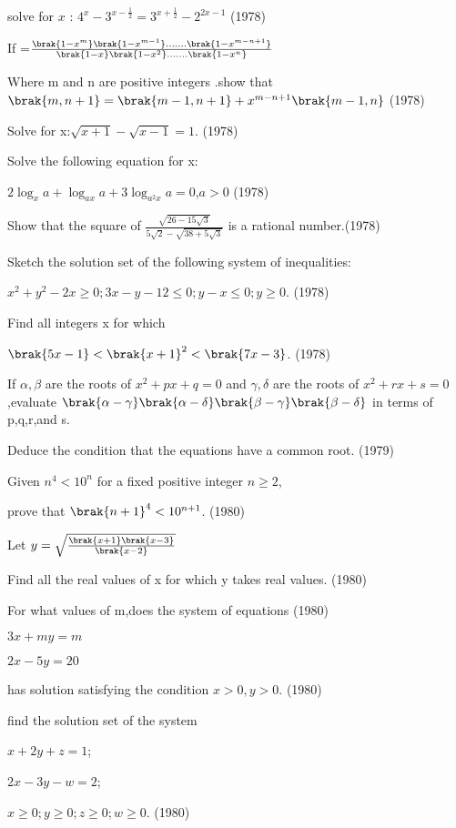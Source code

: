  \iffalse
    \title{Assignment}
    \author{Pappuri Prahladha}
    \section{subjective}
  \fi

     \item solve for $x$ : $4^x-3^{x-\frac{1}{2}}=3^{x+\frac{1}{2}}-2^{2x-1}$                       \hfill  (1978)

 

\item If =$\frac{\brak{1-x^m}\brak{1-x^{m-1}}.......\brak{1-x^{m-n+1}}}{\brak{1-x}\brak{1-x^2}.......\brak{1-x^n}}$

Where m and n are positive integers .show that 
$\brak{m,n+1}=\brak{m-1,n+1}+x^{m-n+1}\brak{m-1,n}$ \hfill (1978)
 \item Solve for x:$\sqrt{x+1}-\sqrt{x-1}=1$.   \hfill (1978)
 \item Solve the following equation for x:
 
$2\log_x a+\log_{ax} a+3\log_{a^2x} a=0$,$a>0$ \hfill (1978)
\item Show that the square of $\frac{\sqrt{26-15\sqrt{3}}}{5\sqrt{2}-\sqrt{38+5\sqrt{3}}}$ is a rational number.\hfill (1978) 
\item Sketch the solution set of the following system of inequalities:

$x^2+y^2-2x\geq 0;3x-y-12\leq 0;y-x\leq 0;y\geq 0$. \hfill (1978)
\item Find all integers x for which

$\brak{5x-1}<\brak{{x+1}}^2<\brak{7x-3}$. \hfill (1978)
\item If $\alpha,\beta$ are the roots of $x^2+px+q=0$ and $\gamma,\delta$ are the roots of $x^2+rx+s=0$,evaluate $\brak{\alpha-\gamma}\brak{\alpha-\delta}\brak{\beta-\gamma}\brak{\beta-\delta}$ in terms of p,q,r,and s. 

Deduce the condition that the equations have a common root. \hfill (1979)
\item Given $n^4<10^n$ for a fixed positive integer $n\geq 2$,

prove that $\brak{n+1}^4<10^{n+1}$. \hfill (1980)
\item Let $y=\sqrt{\frac{\brak{x+1}\brak{x-3}}{\brak{x-2}}}$

Find all the real values of x for which y takes real values. \hfill (1980)
\item For what values of m,does the system of equations \hfill (1980)

$3x+my=m$

$2x-5y=20$

has solution satisfying the condition $x>0,y>0$. \hfill (1980)
\item find the solution set of the system

$x+2y+z=1$;

$2x-3y-w=2$;

$x\geq 0;y\geq 0;z\geq 0;w\geq 0$.  \hfill (1980)


